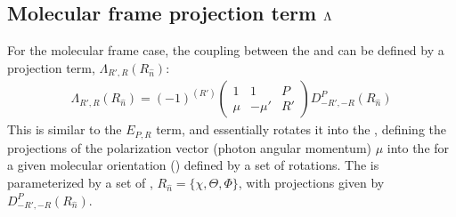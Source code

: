 \documentclass[letterpaper,table,10pt,english]{jupyterBook}
\begin{document}
\subsection{Molecular frame projection term \protect\(\Lambda\protect\)}
\label{\detokenize{part1/theory_tensor_formalism_160723:molecular-frame-projection-term-lambda}}\label{\detokenize{part1/theory_tensor_formalism_160723:sec-theory-lambda-term}}
\sphinxAtStartPar
For the molecular frame case, the coupling between the {\hyperref[\detokenize{backmatter/glossary:term-LF}]{}} and {\hyperref[\detokenize{backmatter/glossary:term-MF}]{}} can be defined by a projection term, \(\Lambda_{R',R}(R_{\hat{n}})\):
\begin{equation}\label{equation:part1/theory_tensor_formalism_160723:eq:basis-lambda-MF-defn}
\begin{split}
\Lambda_{R',R}(R_{\hat{n}})=(-1)^{(R')}\left(\begin{array}{ccc}
1 & 1 & P\\
\mu & -\mu' & R'
\end{array}\right)D_{-R',-R}^{P}(R_{\hat{n}})
\end{split}
\end{equation}
\sphinxAtStartPar
This is similar to the \(E_{P,R}\) term, and essentially rotates it into the {\hyperref[\detokenize{backmatter/glossary:term-MF}]{}}, defining the projections of the polarization vector (photon angular momentum) \(\mu\) into the {\hyperref[\detokenize{backmatter/glossary:term-MF}]{}} for a given molecular orientation ({\hyperref[\detokenize{backmatter/glossary:term-frame-rotation}]{}}) defined by a set of rotations. The {\hyperref[\detokenize{backmatter/glossary:term-frame-rotation}]{}} is parameterized by a set of {\hyperref[\detokenize{backmatter/glossary:term-Euler-angles}]{}}, \(R_{\hat{n}}=\{\chi,\Theta,\Phi\}\), with projections given by {\hyperref[\detokenize{backmatter/glossary:term-Wigner-rotation-matrix-elements}]{}} \(D_{-R',-R}^{P}(R_{\hat{n}})\).
\end{document}

